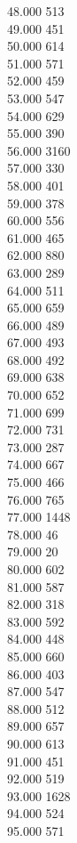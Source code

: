 { 48.000	513 \\
 49.000	451 \\
 50.000	614 \\
 51.000	571 \\
 52.000	459 \\
 53.000	547 \\
 54.000	629 \\
 55.000	390 \\
 56.000	3160 \\
 57.000	330 \\
 58.000	401 \\
 59.000	378 \\
 60.000	556 \\
 61.000	465 \\
 62.000	880 \\
 63.000	289 \\
 64.000	511 \\
 65.000	659 \\
 66.000	489 \\
 67.000	493 \\
 68.000	492 \\
 69.000	638 \\
 70.000	652 \\
 71.000	699 \\
 72.000	731 \\
 73.000	287 \\
 74.000	667 \\
 75.000	466 \\
 76.000	765 \\
 77.000	1448 \\
 78.000	46 \\
 79.000	20 \\
 80.000	602 \\
 81.000	587 \\
 82.000	318 \\
 83.000	592 \\
 84.000	448 \\
 85.000	660 \\
 86.000	403 \\
 87.000	547 \\
 88.000	512 \\
 89.000	657 \\
 90.000	613 \\
 91.000	451 \\
 92.000	519 \\
 93.000	1628 \\
 94.000	524 \\
 95.000	571 \\
}
